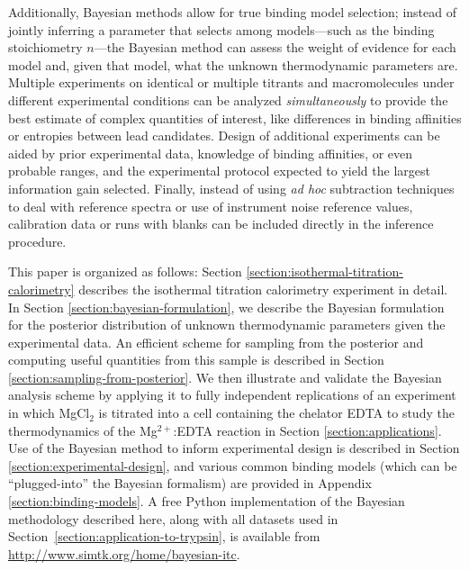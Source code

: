 \documentclass[aps,pre,twocolumn,nofootinbib,superscriptaddress,linenumbers]{revtex4-1}
\newcommand{\pyitc}{\url{http://www.simtk.org/home/bayesian-itc}} %
\begin{document}
Additionally, Bayesian methods allow for true binding model selection; instead of jointly inferring a parameter that selects among models---such as the binding stoichiometry $n$---the Bayesian method can assess the weight of evidence for each model and, given that model, what the unknown thermodynamic parameters are.
Multiple experiments on identical or multiple titrants and macromolecules under different experimental conditions can be analyzed \emph{simultaneously} to provide the best estimate of complex quantities of interest, like differences in binding affinities or entropies between lead candidates.
Design of additional experiments can be aided by prior experimental data, knowledge of binding affinities, or even probable ranges, and the experimental protocol expected to yield the largest information gain selected.
Finally, instead of using \emph{ad hoc} subtraction techniques to deal with reference spectra or use of instrument noise reference values, calibration data or runs with blanks can be included directly in the inference procedure.

This paper is organized as follows:
Section \ref{section:isothermal-titration-calorimetry} describes the isothermal titration calorimetry experiment in detail.
In Section \ref{section:bayesian-formulation}, we describe the Bayesian formulation for the posterior distribution of unknown thermodynamic parameters given the experimental data.
An efficient scheme for sampling from the posterior and computing useful quantities from this sample is described in Section \ref{section:sampling-from-posterior}.
We then illustrate and validate the Bayesian analysis scheme by applying it to fully independent replications of an experiment in which MgCl$_2$ is titrated into a cell containing the chelator EDTA to study the thermodynamics of the Mg$^{2+}$:EDTA reaction in Section \ref{section:applications}.
Use of the Bayesian method to inform experimental design is described in Section \ref{section:experimental-design}, and various common binding models (which can be ``plugged-into'' the Bayesian formalism) are provided in Appendix \ref{section:binding-models}.
A free Python implementation of the Bayesian methodology described here, along with all datasets used in Section~\ref{section:application-to-trypsin}, is available from \pyitc.

\end{document}
